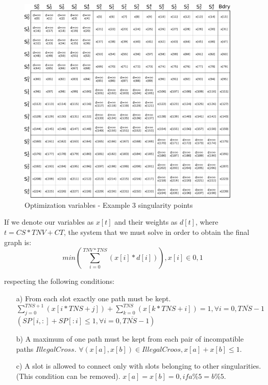 \documentclass[a4paper]{report}
\begin{document}
{{\begin{figure}[h]
\includegraphics[width=0.95\textwidth]{optVarEx}
\caption{Optimization variables - Example 3 singularity points}
\label{fig:optVarEx}
\end{figure}

	If we denote our variables as $x[t]$ and their weights as $d[t]$, 
	where $t = CS * TNV + CT$, the system that we must solve in order to obtain the final graph is: 
	\newline
	$$ min \left(\sum_{i=0}^{TNV*TNS} (x[i]*d[i])\right) , x[i] \in {0,1}$$

	respecting the following conditions:
	\begin{itemize}
	\item[a)] From each slot exactly one path must be kept.
		$\sum_{j=0}^{TNS+1} (x[i*TNS+j]) + \sum_{k=0}^{TNS} (x[k*TNS+i]) = 1,  \forall i = \overline{0,TNS-1}$
	\newline
	$(SP[i,:] + SP[:i] \leq 1, \forall i = \overline{0,TNS-1})$
	
	\item[b)] A maximum of one path must be kept from each pair of incompatible paths \textcolor{myGreen}{$IllegalCross$}.  
	$ \forall (x[a], x[b]) \in IllegalCroos, x[a] + x[b] \leq 1$.
	\item[c)] A slot is allowed to connect only with slots belonging to other singularities. (This condition can be removed).
	$ x[a] = x[b] = 0, if a\%5 = b\%5 $.	


\end{itemize}}}
\end{document}
